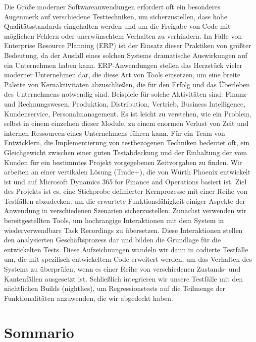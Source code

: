 Die Größe moderner Softwareanwendungen erfordert oft ein besonderes Augenmerk auf verschiedene Testtechniken, um sicherzustellen, dass hohe Qualitätsstandards eingehalten werden und um die Freigabe von Code mit möglichen Fehlern oder unerwünschtem Verhalten zu verhindern. 
Im Falle von Enterprise Resource Planning (ERP) ist der Einsatz dieser Praktiken von größter Bedeutung, da der Ausfall eines solchen Systems dramatische Auswirkungen auf ein Unternehmen haben kann. 
ERP-Anwendungen stellen das Herzstück vieler moderner Unternehmen dar, die diese Art von Tools einsetzen, um eine breite Palette von Kernaktivitäten abzuschließen, die für den Erfolg und das Überleben des Unternehmens notwendig sind. Beispiele für solche Aktivitäten sind: 
Finanz- und Rechnungswesen, Produktion, Distribution, Vertrieb, Business Intelligence, Kundenservice, Personalmanagement. 
Es ist leicht zu verstehen, wie ein Problem, selbst in einem einzelnen dieser Module, zu einem enormen Verlust von Zeit und internen Ressourcen eines Unternehmens führen kann. 
Für ein Team von Entwicklern, die Implementierung von testbezogenen Techniken bedeutet oft, ein Gleichgewicht zwischen einer guten Testabdeckung und der Einhaltung der vom Kunden für ein bestimmtes Projekt vorgegebenen Zeitvorgaben zu finden.
Wir arbeiten an einer vertikalen Lösung (Trade+), die von Würth Phoenix entwickelt ist und auf Microsoft Dynamics 365 for Finance and Operations basiert ist. Ziel des Projekts ist es, eine Stichprobe definierter Kernprozesse mit einer Reihe von Testfällen abzudecken, um die erwartete Funktionsfähigkeit einiger Aspekte der Anwendung in verschiedenen Szenarien sicherzustellen. 
Zunächst verwenden wir bereitgestellten Tools, um hochrangige Interaktionen mit dem System in wiederverwendbare Task Recordings zu übersetzen. Diese Interaktionen stellen den analysierten Geschäftsprozess dar und bilden die Grundlage für die entwickelten Tests. 
Diese Aufzeichnungen wandeln wir dann in codierte Testfälle um, die mit spezifisch entwickeltem Code erweitert werden, um das Verhalten des Systems zu überprüfen, wenn es einer Reihe von verschiedenen Zustands- und Kantenfällen ausgesetzt ist. 
Schließlich integrieren wir unsere Testfälle mit den nächtlichen Builds (nightlies), um Regressionstests auf die Teilmenge der Funktionalitäten anzuwenden, die wir abgedeckt haben. 

\chapter*{Sommario}

